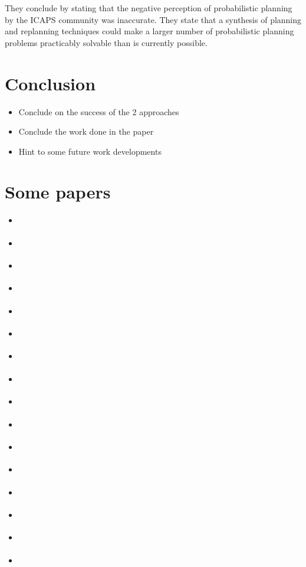 \documentclass[runningheads,a4paper]{llncs}
\begin{document}
They conclude by stating that the negative perception of probabilistic planning by the ICAPS community was inaccurate. They state that a synthesis of planning and replanning techniques could make a larger number of probabilistic planning problems practicably solvable than is currently possible.



\section{Conclusion}

\begin{itemize}
	\item Conclude on the success of the 2 approaches
	\item Conclude the work done in the paper
	\item Hint to some future work developments
\end{itemize}

\section{Some papers}

\begin{itemize}
	\item \cite{Hoffmann01theff}
	\item \cite{FFReplan}
	\item \cite{teichteil2010incremental}
	\item \cite{yoon2008probabilistic}
	\item \cite{teichteil2012fast}
	\item \cite{bonet2011planning}
	\item \cite{taig2013translation}
	\item \cite{martin2013progressive}
	\item \cite{taig2013conformant}
	\item \cite{2013workshop}
	\item \cite{nebel2013much}
	\item \cite{little2007probvsreplan}
	\item \cite{keller2012prost}
	\item \cite{kolobov2012glutton}
	\item \cite{sanner2008rddl}
	\item \cite{kolobov2012gourmand}
\end{itemize}




\end{document}
